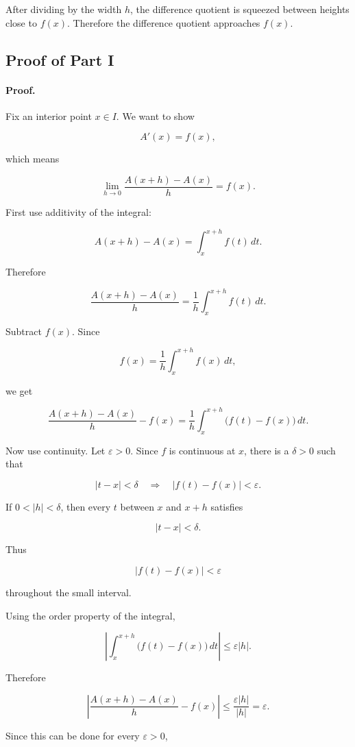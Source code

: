 After dividing by the width \(h\), the difference quotient is squeezed between heights
close to \(f(x)\).  Therefore the difference quotient approaches \(f(x)\).

\subsection{Proof of Part I}
\label{subsec:proof-ftc1}

\paragraph{Proof.}
Fix an interior point \(x\in I\).  We want to show

\[
A'(x)=f(x),
\]

which means

\[
\lim_{h\to0}\frac{A(x+h)-A(x)}{h}=f(x).
\]

First use additivity of the integral:

\[
A(x+h)-A(x)=\int_x^{x+h} f(t)\,dt.
\]

Therefore

\[
\frac{A(x+h)-A(x)}{h}
=
\frac1h\int_x^{x+h} f(t)\,dt.
\]

Subtract \(f(x)\).  Since

\[
f(x)=\frac1h\int_x^{x+h} f(x)\,dt,
\]

we get

\[
\frac{A(x+h)-A(x)}{h}-f(x)
=
\frac1h\int_x^{x+h}\bigl(f(t)-f(x)\bigr)\,dt.
\]

Now use continuity.  Let \(\varepsilon>0\).  Since \(f\) is continuous at \(x\), there is a
\(\delta>0\) such that

\[
|t-x|<\delta
\quad\Longrightarrow\quad
|f(t)-f(x)|<\varepsilon.
\]

If \(0<|h|<\delta\), then every \(t\) between \(x\) and \(x+h\) satisfies

\[
|t-x|<\delta.
\]

Thus

\[
|f(t)-f(x)|<\varepsilon
\]

throughout the small interval.

Using the order property of the integral,

\[
\left|
\int_x^{x+h}\bigl(f(t)-f(x)\bigr)\,dt
\right|
\le
\varepsilon |h|.
\]

Therefore

\[
\left|
\frac{A(x+h)-A(x)}{h}-f(x)
\right|
\le
\frac{\varepsilon |h|}{|h|}
=
\varepsilon.
\]

Since this can be done for every \(\varepsilon>0\),

